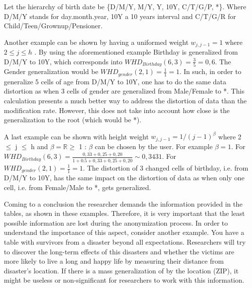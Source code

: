 \documentclass{llncs}
\newcommand{\R}{\mathbb{R}}
\begin{document}
Let the hierarchy of birth date be \{D/M/Y, M/Y, Y, 10Y, C/T/G/P, *\}. Where D/M/Y  stands for day.month.year, 10Y a 10 years interval and C/T/G/R for Child/Teen/Grownup/Pensioner.

Another example can be shown by having a uniformed weight $w_{j,j-1} = 1$ where $2\leq j \leq h$ \cite{li2006achieving}. By using the aforementioned example Birthday is generalized from D/M/Y to 10Y, which corresponds into $WHD_{Birthday}(6,3) = \frac{3}{5} = 0,6$. 
The Gender generalization would be $WHD_{gender}(2,1) = \frac{1}{1} = 1$. In such, in order to generalize 5 cells of age from D/M/Y to 10Y, one has to do the same data distortion as when 3 cells of gender are generalized from Male/Female to *. This calculation presents a much better way to address the distortion of data than the modification rate. However, this does not take into account how close is the generalization to the root (which would be *).

A last example can be shown with height weight $w_{j,j-1} = 1 / (j-1)^{\beta}$ where 2 $\leq$ j $\leq$ h and $\beta = \R \geq$ 1 \cite{li2006achieving}:
$\beta$ can be chosen by the user. For example $\beta = 1$. For $WHD_{Birthday}(6,3) = \frac{0,\overline{33}+0,25+0,20}{1+0.5+0,\overline{33}+0,25+0,20} \sim 0,3431$. For $WHD_{gender}(2,1) = \frac{1}{1} = 1$. The distortion of 3 changed cells of birthday, i.e. from D/M/Y to 10Y, has the same impact on the distortion of data as when only one cell, i.e. from Female/Male to *, gets generalized.

Coming to a conclusion the researcher demands the information provided in the tables, as shown in these examples. Therefore, it is very important that the least possible information are lost during the anonymization process. In order to understand the importance of this aspect, consider another example. You have a table with survivors from a disaster beyond all expectations. Researchers will try to discover the long-term effects of this disasters and whether the victims are more likely to live a long and happy life by measuring their distance from disaster’s location. If there is a mass generalization of by the location (ZIP), it might be useless or non-significant for researchers to work with this information.
\end{document}
